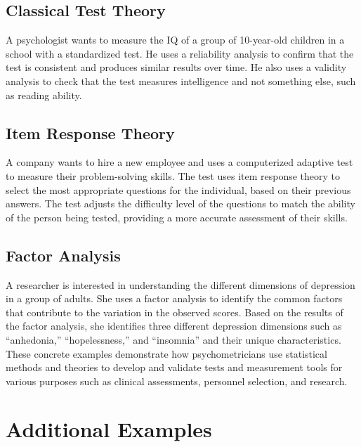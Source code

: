 \documentclass[12pt, a4paper]{exam}
\begin{document}
\subsection{Classical Test Theory}

A psychologist wants to measure the IQ of a group of 10-year-old children in a school with a standardized test. He uses a reliability analysis to confirm that the test is consistent and produces similar results over time. He also uses a validity analysis to check that the test measures intelligence and not something else, such as reading ability.

\subsection{Item Response Theory}

A company wants to hire a new employee and uses a computerized adaptive test to measure their problem-solving skills. The test uses item response theory to select the most appropriate questions for the individual, based on their previous answers. The test adjusts the difficulty level of the questions to match the ability of the person being tested, providing a more accurate assessment of their skills.

\subsection{Factor Analysis}

A researcher is interested in understanding the different dimensions of depression in a group of adults. She uses a factor analysis to identify the common factors that contribute to the variation in the observed scores. Based on the results of the factor analysis, she identifies three different depression dimensions such as “anhedonia,” “hopelessness,” and “insomnia” and their unique characteristics. These concrete examples demonstrate how psychometricians use statistical methods and theories to develop and validate tests and measurement tools for various purposes such as clinical assessments, personnel selection, and research.

\section{Additional Examples}
\end{document}
